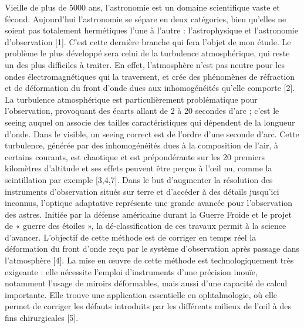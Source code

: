 \documentclass[12pt,a4paper]{extarticle}
\begin{document}
  Vieille de plus de 5000 ans, l’astronomie est un domaine scientifique vaste et fécond.
Aujourd’hui l’astronomie se sépare en deux catégories, bien qu’elles ne soient pas
totalement hermétiques l’une à l’autre : l’astrophysique et l’astronomie d’observation [1].
C’est cette dernière branche qui fera l’objet de mon étude. Le problème le plus développé
sera celui de la turbulence atmosphérique, qui reste un des plus difficiles à traiter.
En effet, l’atmosphère n’est pas neutre pour les ondes électromagnétiques qui la
traversent, et crée des phénomènes de réfraction et de déformation du front d’onde dues
aux inhomogénéités qu’elle comporte [2].
La turbulence atmosphérique est particulièrement problématique pour l’observation,
provoquant des écarts allant de 2 à 20 secondes d’arc ; c’est le seeing auquel on associe des
tailles caractéristiques qui dépendent de la longueur d’onde. Dans le visible, un seeing
correct est de l’ordre d’une seconde d’arc.
Cette turbulence, générée par des inhomogénéités dues à la composition de l’air, à
certains courants, est chaotique et est prépondérante sur les 20 premiers kilomètres
d’altitude et ses effets peuvent être perçus à l’œil nu, comme la scintillation par exemple
[3,4,7].
Dans le but d’augmenter la résolution des instruments d’observation situés sur terre
et d’accéder à des détails jusqu’ici inconnus, l’optique adaptative représente une grande
avancée pour l’observation des astres.
Initiée par la défense américaine durant la Guerre Froide et le projet de « guerre des
étoiles », la dé-classification de ces travaux permit à la science d’avancer.
L’objectif de cette méthode est de corriger en temps réel la déformation du front
d’onde reçu par le système d’observation après passage dans l’atmosphère [4]. La mise en
œuvre de cette méthode est technologiquement très exigeante : elle nécessite l’emploi
d’instruments d’une précision inouïe, notamment l’usage de miroirs déformables, mais aussi
d’une capacité de calcul importante.
Elle trouve une application essentielle en ophtalmologie, où elle permet de corriger
les défauts introduits par les différents milieux de l’œil à des fins chirurgicales [5].
\end{document}
